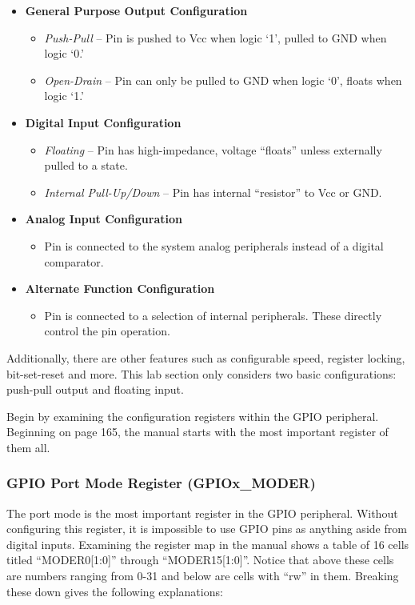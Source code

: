 \documentclass[11pt,fleqn]{book} %
\begin{document}
\begin{itemize}
    \item \textbf{General Purpose Output Configuration}
    \begin{itemize}
        \item \textit{Push-Pull} -- Pin is pushed to Vcc when logic `1', pulled to GND when logic `0.'
        \item \textit{Open-Drain} -- Pin can only be pulled to GND when logic `0', floats when logic `1.'
    \end{itemize}
    \item \textbf{Digital Input Configuration}
    \begin{itemize}
        \item \textit{Floating} -- Pin has high-impedance, voltage ``floats'' unless externally pulled to a state.
        \item \textit{Internal Pull-Up/Down} -- Pin has internal ``resistor'' to Vcc or GND.
    \end{itemize}
    \item \textbf{Analog Input Configuration}
    \begin{itemize}
        \item Pin is connected to the system analog peripherals instead of a digital comparator.
    \end{itemize}
    \item \textbf{Alternate Function Configuration}
    \begin{itemize}
        \item Pin is connected to a selection of internal peripherals. These directly control the pin operation.
    \end{itemize}
\end{itemize} 

Additionally, there are other features such as configurable speed, register locking, bit-set-reset and more. This lab section only considers two basic configurations: push-pull output and floating input.

Begin by examining the configuration registers within the GPIO peripheral. Beginning on page 165, the manual starts with the most important register of them all. 

\subsubsection{GPIO Port Mode Register (GPIOx\_MODER)}

The port mode is the most important register in the GPIO peripheral. Without configuring this register, it is impossible to use GPIO pins as anything aside from digital inputs. Examining the register map in the manual shows a table of 16 cells titled ``MODER0[1:0]'' through ``MODER15[1:0]''. Notice that above these cells are numbers ranging from 0-31 and below are cells with ``rw'' in them. Breaking these down gives the following explanations: 
\end{document}
